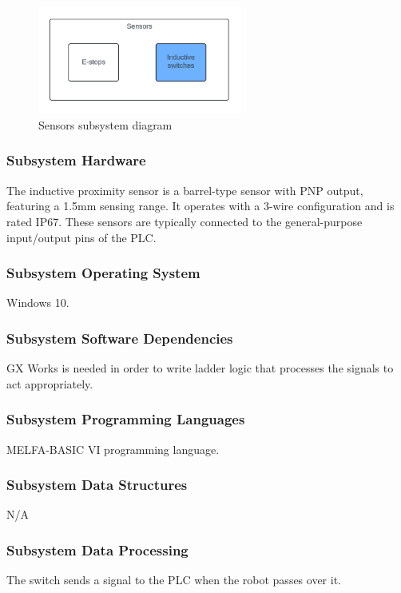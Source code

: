 \begin{figure}[h!]
	\centering
 	\includegraphics[width=0.60\textwidth]{images/Inductive_sensors.png}
 \caption{Sensors subsystem diagram}
\end{figure}

\subsubsection{Subsystem Hardware}
The inductive proximity sensor is a barrel-type sensor with PNP output, featuring a 1.5mm sensing range. It operates with a 3-wire configuration and is rated IP67. These sensors are typically connected to the general-purpose input/output pins of the PLC.%

\subsubsection{Subsystem Operating System}
Windows 10.

\subsubsection{Subsystem Software Dependencies}
GX Works is needed in order to write ladder logic that processes the signals to act appropriately.

\subsubsection{Subsystem Programming Languages}
MELFA-BASIC VI programming language.

\subsubsection{Subsystem Data Structures}
N/A

\subsubsection{Subsystem Data Processing}
The switch sends a signal to the PLC when the robot passes over it. 

